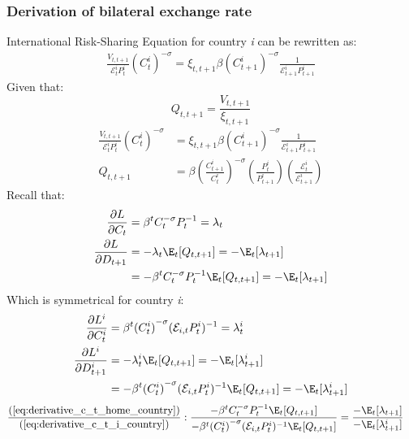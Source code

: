 \subsubsection*{Derivation of bilateral exchange rate}
International Risk-Sharing Equation for country \textit{i} can be rewritten as:
\begin{align}
    \frac{V_{t,t+1}}{\mathcal{E}^i_tP^i_t}({C^{i}_{t}})^{-\sigma} = \xi_{t,t+1} \beta ({C^{i}_{t+1}})^{-\sigma} \frac{1}{\mathcal{E}^i_{t+1}P^{i}_{t+1}}
\end{align}
Given that:
\begin{equation}
    Q_{t,t+1} = \frac{V_{t,t+1}}{\xi_{t,t+1}}
\end{equation}
\begin{align}
    \frac{V_{t,t+1}}{\mathcal{E}^i_tP^i_t}({C^{i}_{t}})^{-\sigma}         & = \xi_{t,t+1} \beta ({C^{i}_{t+1}})^{-\sigma} \frac{1}{\mathcal{E}^i_{t+1}P^{i}_{t+1}}                                                                    \\
    Q_{t,t+1}                                                             & = \beta \left(\frac{C^i_{t+1}}{C^i_{t}}\right)^{-\sigma} \left(\frac{P^i_t}{P^i_{t+1}}\right) \left(\frac{\mathcal{E}^i_{t}}{\mathcal{E}^i_{t+1}} \right) 
\end{align}
Recall that:
\begin{align}
    \frac{\partial L}{\partial C_t} &= \beta^t C_t^{-\sigma} P_{t}^{-1} = \lambda_t \nonumber\\
    \frac{\partial L}{\partial D_{t+1}} & = -\lambda_t \E_t[Q_{t,t+1}] = -\E_t[\lambda_{t+1}] \nonumber\\
    &=-\beta^t C_t^{-\sigma} P_{t}^{-1} \E_t[Q_{t,t+1}] = -\E_t[\lambda_{t+1}] \label{eq:derivative_c_t_home_country}
\end{align}
Which is symmetrical for country \textit{i}:
\begin{align}
    \frac{\partial L^i}{\partial C_t^i} &= \beta^t {(C^i_t)}^{-\sigma} (\mathcal{E}_{i,t}P^i_{t})^{-1} = \lambda^i_t \nonumber\\
    \frac{\partial L^i}{\partial D_{t+1}^i} & = -\lambda^i_t \E_t[Q_{t,t+1}] = -\E_t[\lambda^i_{t+1}] \nonumber\\
    &=-\beta^t {(C^i_t)}^{-\sigma} (\mathcal{E}_{i,t}P^i_{t})^{-1} \E_t[Q_{t,t+1}] = -\E_t[\lambda^i_{t+1}] \label{eq:derivative_c_t_i_country}
\end{align}
\begin{align*}
    \frac{\text{(\ref{eq:derivative_c_t_home_country})}}{\text{(\ref{eq:derivative_c_t_i_country})}}: \frac{-\beta^t C_t^{-\sigma} P_{t}^{-1} \E_t[Q_{t,t+1}]}{-\beta^t {(C^i_t)}^{-\sigma} (\mathcal{E}_{i,t}P^i_{t})^{-1} \E_t[Q_{t,t+1}]} &= \frac{-\E_t[\lambda_{t+1}]}{-\E_t[\lambda^i_{t+1}]}
\end{align*} 
